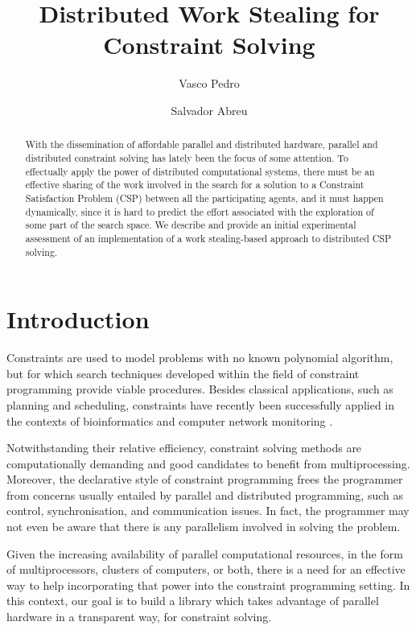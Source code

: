 \documentclass{llncs}
\title{Distributed Work Stealing for \\ Constraint Solving}
\author{Vasco Pedro \and Salvador Abreu}
\institute{Departamento de Inform\'atica,
  Universidade de \'Evora and
  \\[3pt]
  CENTRIA FCT/UNL, Portugal
  \\[2pt]
  \email{\{vp,spa\}@di.uevora.pt}}
\begin{document}
\maketitle

\begin{abstract}
  With the dissemination of affordable parallel and distributed
  hardware, parallel and distributed constraint solving has lately
  been the focus of some attention. To effectually apply the power of
  distributed computational systems, there must be an effective
  sharing of the work involved in the search for a solution to a
  Constraint Satisfaction Problem (CSP) between all the participating
  agents, and it must happen dynamically, since it is hard to predict
  the effort associated with the exploration of some part of the
  search space. We describe and provide an initial experimental
  assessment of an implementation of a work stealing-based approach to
  distributed CSP solving.
\end{abstract}


\section{Introduction}

Constraints are used to model problems with no known polynomial
algorithm, but for which search techniques developed within the field
of constraint programming provide viable procedures. Besides classical
applications, such as planning and scheduling, constraints have
recently been successfully applied in the contexts of bioinformatics
\cite{HCP:bioinf} and computer network monitoring \cite{pds@inap2009}.

Notwithstanding their relative efficiency, constraint solving methods
are computationally demanding and good candidates to benefit from
multiprocessing. Moreover, the declarative style of constraint
programming frees the programmer from concerns usually entailed by
parallel and distributed programming, such as control,
synchronisation, and communication issues. In fact, the programmer may
not even be aware that there is any parallelism involved in solving
the problem.

Given the increasing availability of parallel computational resources,
in the form of multiprocessors, clusters of computers, or both, there
is a need for an effective way to help incorporating that power into
the constraint programming setting. In this context, our goal is to
build a library which takes advantage of parallel hardware in a
transparent way, for constraint solving.
\end{document}
